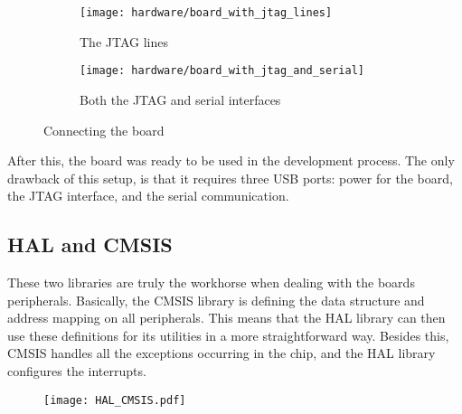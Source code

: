 \begin{figure}[H]
\centering
\begin{subfigure}{.5\textwidth}
  \centering
  \texttt{[image: hardware/board\_with\_jtag\_lines]}
  \caption{The JTAG lines}
  \label{fig:sub1}
\end{subfigure}%
\begin{subfigure}{.5\textwidth}
  \centering
  \texttt{[image: hardware/board\_with\_jtag\_and\_serial]}
  \caption{Both the JTAG and serial interfaces}
  \label{fig:sub2}
\end{subfigure}
\caption{Connecting the board}
\label{fig:photo2}
\end{figure}

After this, the board was ready to be used in the development process.
The only drawback of this setup, is that it requires three USB ports:
power for the board, the JTAG interface, and the serial communication.

\subsection{HAL and CMSIS}
These two libraries are truly the workhorse when dealing with the 
board\textquotesingle s peripherals. Basically, the CMSIS library
is defining the data structure and address mapping on all peripherals.
This means that the HAL library can then use these definitions for its
utilities in a more straightforward way. Besides this, CMSIS handles
all the exceptions occurring in the chip, and the HAL library configures
the interrupts.
 
\begin{figure}[H]
\centering
\texttt{[image: HAL\_CMSIS.pdf]}
\end{figure}
